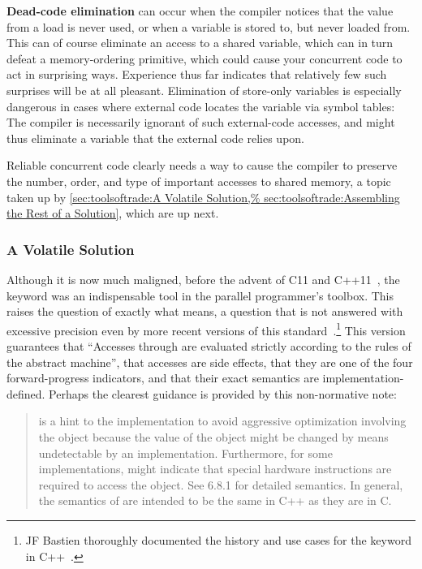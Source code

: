{\bf Dead-code elimination} can occur when the compiler notices that
the value from a load is never used, or when a variable is stored to,
but never loaded from.
This can of course eliminate an access to a shared variable, which
can in turn defeat a memory-ordering primitive, which could cause your
concurrent code to act in surprising ways.
Experience thus far indicates that relatively few such surprises will
be at all pleasant.
Elimination of store-only variables is especially dangerous in cases
where external code locates the variable via symbol tables:
The compiler is necessarily ignorant of such external-code accesses,
and might thus eliminate a variable that the external code relies upon.

Reliable concurrent code clearly needs a way to cause the compiler to
preserve the number, order, and type of important accesses to shared
memory, a topic taken up by
\cref{sec:toolsoftrade:A Volatile Solution,%
sec:toolsoftrade:Assembling the Rest of a Solution},
which are up next.

\subsubsection{A Volatile Solution}
\label{sec:toolsoftrade:A Volatile Solution}

Although it is now much maligned, before the advent of C11 and
C++11~\cite{PeteBecker2011N3242}, the  keyword was an
indispensable tool in the parallel programmer's toolbox.
This raises the question of exactly what  means,
a question that is not answered with excessive precision even
by more recent versions of this standard~\cite{RichardSmith2019N4800}.\footnote{
	JF Bastien thoroughly documented the history and use cases
	for the  keyword in
	C++~\cite{JFBastien2018DeprecatingVolatile}.}
This version guarantees that ``Accesses through 
 are evaluated strictly according to the rules of the
abstract machine'',
that  accesses are side effects,
that they are one of the four forward-progress indicators,
and that their exact semantics are implementation-defined.
Perhaps the clearest guidance is provided by this non-normative note:

\begin{quote}
	 is a hint to the implementation to avoid
	aggressive optimization involving the object because the value
	of the object might be changed by means undetectable by an
	implementation.
	Furthermore, for some implementations,  might indicate
	that special hardware instructions are required to access
	the object.
	See 6.8.1 for detailed semantics.
	In general, the semantics of  are intended to be the
	same in C++ as they are in C.
\end{quote}

